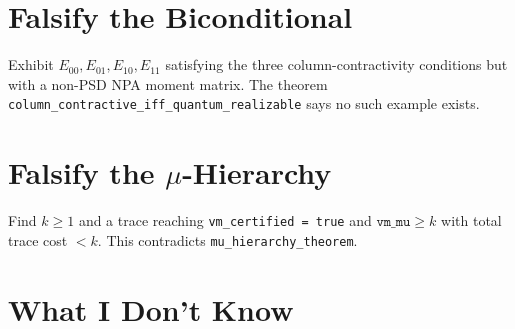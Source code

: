\documentclass[11pt, a4paper]{report}
\theoremstyle{definition}
\theoremstyle{plain}
\begin{document}
\section{Falsify the Biconditional}

Exhibit $E_{00}, E_{01}, E_{10}, E_{11}$ satisfying the three column-contractivity conditions but with a non-PSD NPA moment matrix. The theorem \texttt{column\_contractive\_iff\_quantum\_realizable} says no such example exists.

\section{Falsify the $\mu$-Hierarchy}

Find $k \geq 1$ and a trace reaching \texttt{vm\_certified = true} and $\texttt{vm\_mu} \geq k$ with total trace cost $< k$. This contradicts \texttt{mu\_hierarchy\_theorem}.

\section{What I Don't Know}
\end{document}
